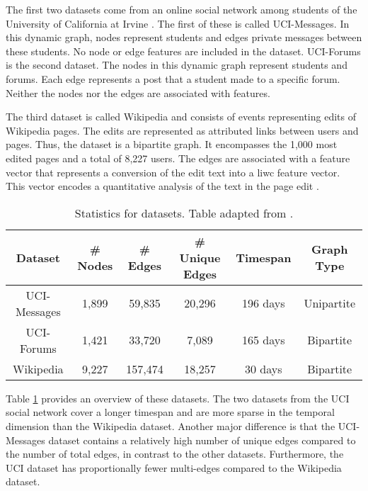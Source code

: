 The first two datasets come from an online social network among students of the University of California at Irvine \cite{kunegis_konect_2013}. The first of these is called UCI-Messages. In this dynamic graph, nodes represent students and edges private messages between these students. No node or edge features are included in the dataset. UCI-Forums is the second dataset. The nodes in this dynamic graph represent students and forums. Each edge represents a post that a student made to a specific forum. Neither the nodes nor the edges are associated with features.

The third dataset is called Wikipedia \cite{kumar_predicting_2019} and consists of events representing edits of Wikipedia pages. The edits are represented as attributed links between users and pages. Thus, the dataset is a bipartite graph. It encompasses the 1,000 most edited pages and a total of 8,227 users. The edges are associated with a feature vector that represents a conversion of the edit text into a \gls{liwc} \cite{pennebaker_linguistic_2001} feature vector. This vector encodes a quantitative analysis of the text in the page edit \cite{pennebaker_linguistic_2001}.

\begin{table}[h]
    \centering
    \begin{tabular}{cccccc}
        \hline
         Dataset&  \# Nodes&  \# Edges&  \# Unique Edges& Timespan & Graph Type\\
         \hline
         UCI-Messages \cite{kunegis_konect_2013} & 1,899 & 59,835 & 20,296 &196 days & Unipartite\\
        UCI-Forums \cite{kunegis_konect_2013}& 1,421& 33,720& 7,089&165 days& Bipartite\\
        Wikipedia \cite{kumar_predicting_2019}& 9,227& 157,474& 18,257&30 days& Bipartite\\
        \hline
    \end{tabular}
    \caption{Statistics for datasets. Table adapted from \cite{poursafaei_towards_2022}.}
    \label{t_Datasets}
\end{table}

Table \ref{t_Datasets} provides an overview of these datasets. The two datasets from the UCI social network cover a longer timespan and are more sparse in the temporal dimension than the Wikipedia dataset. Another major difference is that the UCI-Messages dataset contains a relatively high number of unique edges compared to the number of total edges, in contrast to the other datasets. 
Furthermore, the UCI dataset has proportionally fewer multi-edges compared to the Wikipedia dataset.


